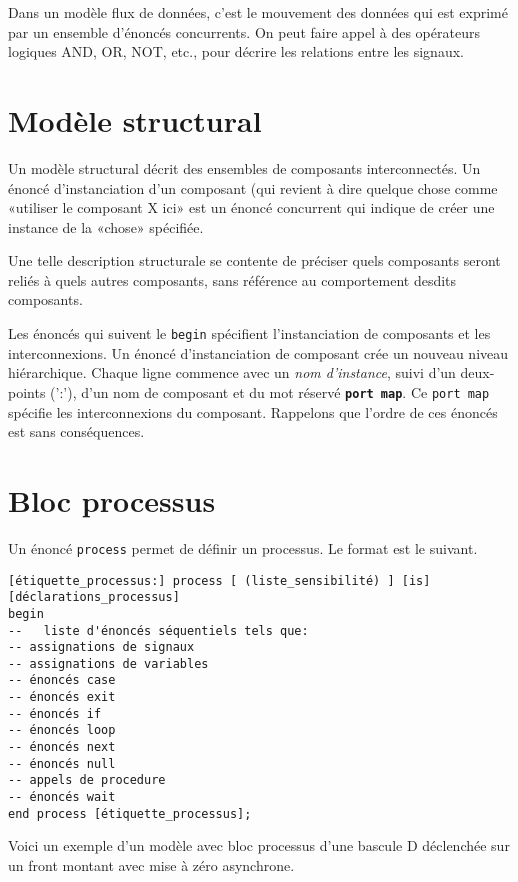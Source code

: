 \documentclass[letter, oneside]{book}
\begin{document}
Dans un modèle flux de données, c'est le mouvement des données qui est
exprimé par un ensemble d'énoncés concurrents. On peut faire appel à
des opérateurs logiques AND, OR, NOT, etc., pour décrire les relations
entre les signaux.

\section{Modèle structural}
\label{sec:orgd818417}

Un modèle structural décrit des ensembles de composants
interconnectés. Un énoncé d'instanciation d'un composant (qui revient
à dire quelque chose comme «utiliser le composant X ici» est un énoncé
concurrent qui indique de créer une instance de la «chose» spécifiée.

Une telle description structurale se contente de préciser quels
composants seront reliés à quels autres composants, sans référence au
comportement desdits composants.

Les énoncés qui suivent le \texttt{begin} spécifient l'instanciation de
composants et les interconnexions. Un énoncé d'instanciation de
composant crée un nouveau niveau hiérarchique. Chaque ligne commence
avec un \emph{nom d'instance}, suivi d'un deux-points (':'), d'un nom de
composant et du mot réservé \textbf{\texttt{port map}}.  Ce \texttt{port map} spécifie les
interconnexions du composant. Rappelons que l'ordre de ces
énoncés est sans conséquences.

\section{Bloc processus}
\label{sec:org062da0c}

Un énoncé \texttt{process} permet de définir un processus. Le format est le
suivant.

\begin{listing}[htbp]
\begin{verbatim}
[étiquette_processus:] process [ (liste_sensibilité) ] [is]
[déclarations_processus]
begin
--   liste d'énoncés séquentiels tels que:
-- assignations de signaux 
-- assignations de variables
-- énoncés case
-- énoncés exit
-- énoncés if 
-- énoncés loop 
-- énoncés next
-- énoncés null
-- appels de procedure
-- énoncés wait
end process [étiquette_processus];
\end{verbatim}
\caption{Bloc processus}
\end{listing}

Voici un exemple d'un modèle avec bloc processus d'une bascule D
déclenchée sur un front montant avec mise à zéro asynchrone.
\end{document}
